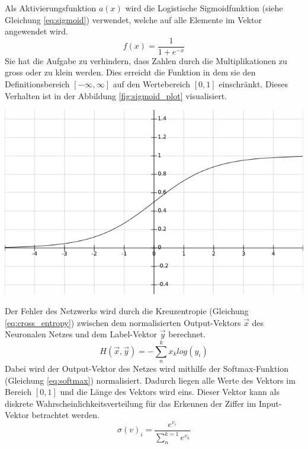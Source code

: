 \documentclass[Interploate_hadwritten_Digits.tex]{subfiles}
\begin{document}
	Als Aktivierungsfunktion $ a(x) $ wird die Logistische Sigmoidfunktion (siehe Gleichung \ref{eq:sigmoid}) verwendet, welche auf alle Elemente im Vektor angewendet wird. 
	\begin{equation}
	f(x)=\frac{1}{1+e^{-x}}
	\label{eq:sigmoid}
	\end{equation}
	Sie hat die Aufgabe zu verhindern, dass Zahlen durch die Multiplikationen zu gross oder zu klein werden. Dies erreicht die Funktion in dem sie den Definitionsbereich $ [-\infty, \infty] $ auf den Wertebereich $ [0, 1] $ einschränkt. Dieses Verhalten ist in der Abbildung \ref{fig:sigmoid_plot} visualisiert.
	\begin{Figure}
		\centering
		\includegraphics[width=\linewidth]{img/sigmoid_plot.png}
		\label{fig:sigmoid_plot}
	\end{Figure}

	Der Fehler des Netzwerks wird durch die Kreuzentropie (Gleichung \ref{eq:cross_entropy}) zwischen dem normalisierten Output-Vektors $ \vec{x} $ des Neuronalen Netzes und dem Label-Vektor $ \vec{y} $ berechnet.
	\begin{equation}
	H(\vec{x}, \vec{y}) = -\sum_{n}^{k}x_{k}log(y_{i})
	\label{eq:cross_entropy}
	\end{equation}
	Dabei wird der Output-Vektor des Netzes wird mithilfe der Softmax-Funktion (Gleichung \ref{eq:softmax}) normalisiert. Dadurch liegen alle Werte des Vektors im Bereich $ [0, 1] $ und die Länge des Vektors wird eins. Dieser Vektor kann als diskrete Wahrscheinlichkeitsverteilung für das Erkennen der Ziffer im Input-Vektor betrachtet werden.
	\begin{equation}
	\sigma(v)_{i} = \frac{e^{v_{i}}}{\sum_{n}^{k=1}e^{v_{k}}}
	\label{eq:softmax}
	\end{equation}
	
\end{document}
